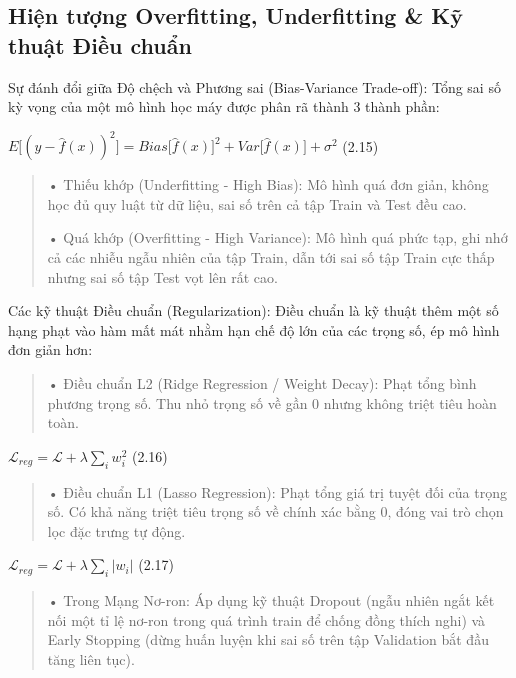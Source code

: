 \subsection{Hiện tượng Overfitting, Underfitting \& Kỹ thuật Điều chuẩn}\label{hiux1ec7n-tux1b0ux1ee3ng-overfitting-underfitting-kux1ef9-thuux1eadt-ux111iux1ec1u-chuux1ea9n}

Sự đánh đổi giữa Độ chệch và Phương sai (Bias-Variance Trade-off): Tổng
sai số kỳ vọng của một mô hình học máy được phân rã thành 3 thành phần:

\(E\lbrack(y - \hat{f}(x))^{2}\rbrack = Bias\lbrack\hat{f}(x)\rbrack^{2} + Var\lbrack\hat{f}(x)\rbrack + \sigma^{2}\)
(2.15)

\begin{quote}
• Thiếu khớp (Underfitting - High Bias): Mô hình quá đơn giản, không học
đủ quy luật từ dữ liệu, sai số trên cả tập Train và Test đều cao.

• Quá khớp (Overfitting - High Variance): Mô hình quá phức tạp, ghi nhớ
cả các nhiễu ngẫu nhiên của tập Train, dẫn tới sai số tập Train cực thấp
nhưng sai số tập Test vọt lên rất cao.
\end{quote}

Các kỹ thuật Điều chuẩn (Regularization): Điều chuẩn là kỹ thuật thêm
một số hạng phạt vào hàm mất mát nhằm hạn chế độ lớn của các trọng số,
ép mô hình đơn giản hơn:

\begin{quote}
• Điều chuẩn L2 (Ridge Regression / Weight Decay): Phạt tổng bình phương
trọng số. Thu nhỏ trọng số về gần 0 nhưng không triệt tiêu hoàn toàn.
\end{quote}

\(\mathcal{L}_{reg} = \mathcal{L} + \lambda\sum_{i}^{}w_{i}^{2}\) (2.16)

\begin{quote}
• Điều chuẩn L1 (Lasso Regression): Phạt tổng giá trị tuyệt đối của
trọng số. Có khả năng triệt tiêu trọng số về chính xác bằng 0, đóng vai
trò chọn lọc đặc trưng tự động.
\end{quote}

\(\mathcal{L}_{reg} = \mathcal{L} + \lambda\sum_{i}^{}|w_{i}|\) (2.17)

\begin{quote}
• Trong Mạng Nơ-ron: Áp dụng kỹ thuật Dropout (ngẫu nhiên ngắt kết nối
một tỉ lệ nơ-ron trong quá trình train để chống đồng thích nghi) và
Early Stopping (dừng huấn luyện khi sai số trên tập Validation bắt đầu
tăng liên tục).
\end{quote}

